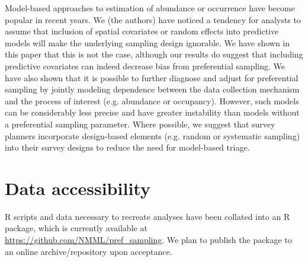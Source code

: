 \documentclass[times,mee,doublespace,]{besauth2}
\begin{document}
Model-based approaches to estimation of abundance or occurrence have become popular in recent years.  We (the authors) have noticed a tendency for analysts to assume that inclusion of spatial covariates or random effects into predictive models will make the underlying sampling design ignorable. We have shown in this paper that this is not the case, although our results do suggest that including predictive covariates can indeed decrease bias from preferential sampling. We have also shown that it is possible to further diagnose and adjust for preferential sampling by jointly modeling dependence between the data collection mechanism and the process of interest (e.g. abundance or occupancy).  However, such models can be considerably less precise and have greater instability than models without a preferential sampling parameter. Where possible, we suggest that survey planners incorporate design-based elements (e.g. random or systematic sampling) into their survey designs to reduce the need for model-based triage.




\vspace{.3in}
\section{Data accessibility}
R scripts and data necessary to recreate analyses have been collated into an R package, which is currently available at \url{https://github.com/NMML/pref_sampling}.  We plan to publish the package to an online archive/repository upon acceptance. \\




\end{document}
